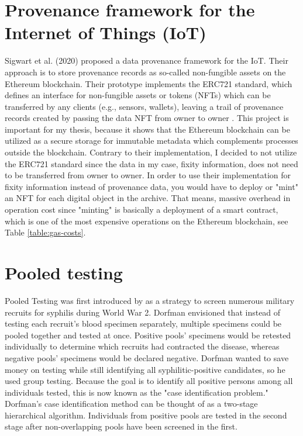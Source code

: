 \section{Provenance framework for the Internet of Things (IoT)}
Sigwart et al. (2020) proposed a data provenance framework for the IoT. Their approach is to store provenance records as so-called non-fungible assets on the Ethereum blockchain. Their prototype implements the ERC721 standard, which defines an interface for non-fungible assets or tokens (NFTs) which can be transferred by any clients (e.g., sensors, wallets), leaving a trail of provenance records created by passing the data NFT from owner to owner \cite[7]{Sigwart2020}. 
This project is important for my thesis, because it shows that the Ethereum blockchain can be utilized as a secure storage for immutable metadata which complements processes outside the blockchain.
Contrary to their implementation, I decided to not utilize the ERC721 standard since the data in my case, fixity information, does not need to be transferred from owner to owner. In order to use their implementation for fixity information instead of provenance data, you would have to deploy or "mint" an NFT for each digital object in the archive. That means, massive overhead in operation cost since "minting" is basically a deployment of a smart contract, which is one of the most expensive operations on the Ethereum blockchain, see Table \ref{table:gas-costs}.

\section{Pooled testing}\label{sec:pooled}
Pooled Testing was first introduced by \cite{dorfman1943detection} as a strategy to screen numerous military recruits for syphilis during World War 2. Dorfman envisioned that instead of testing each recruit's blood specimen separately, multiple specimens could be pooled together and tested at once. Positive pools' specimens would be retested individually to determine which recruits had contracted the disease, whereas negative pools' specimens would be declared negative. Dorfman wanted to save money on testing while still identifying all syphilitic-positive candidates, so he used group testing. Because the goal is to identify all positive persons among all individuals tested, this is now known as the "case identification problem." Dorfman's case identification method can be thought of as a two-stage hierarchical algorithm. Individuals from positive pools are tested in the second stage after non-overlapping pools have been screened in the first.

